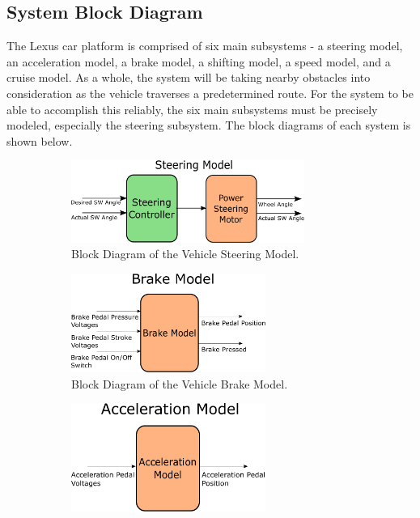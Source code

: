 \documentclass[12pt]{article} %
\begin{document}
\subsection{System Block Diagram}
The Lexus car platform is comprised of six main subsystems - a steering model,
an acceleration model, a brake model, a shifting model, a speed model, and a
cruise model. As a whole, the system will be taking nearby obstacles into consideration as the vehicle traverses a predetermined route. For the
system to be able to accomplish this reliably, the six main subsystems must be
precisely modeled, especially the steering subsystem. The block diagrams of each system is shown below.
%
\begin{figure}
%
\begin{figure}[h]
    \centering
    \captionsetup{justification=centering, margin=3cm}
    \includegraphics[width=3in]{figs/inkscape/steeringModelArchitecture}
    \caption{Block Diagram of the Vehicle Steering Model.}
    \label{fig:steerBlockDiag}
\end{figure}
%
\begin{figure}
    \centering
    \captionsetup{justification=centering, margin=3cm}
    \includegraphics[width=2.5in]{figs/inkscape/brakeModelArchitecture}
    \caption{Block Diagram of the Vehicle Brake Model.}
    \label{fig:brakeBlockDiag}
\end{figure}
%
\begin{figure}
    \centering
    \captionsetup{justification=centering, margin=3cm}
    \includegraphics[width=2.5in]{figs/inkscape/accelerationModelArchitecture}

\end{figure}
\end{figure}
\end{document}
